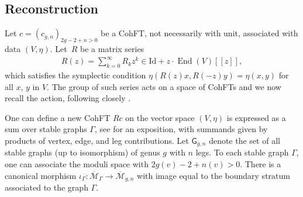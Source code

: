 \documentclass[10pt,a4paper]{amsart}
\def\oM{\overline{\mathcal{M}}}
\def\n{\mathrm{n}}
\def\V{\mathrm{V}}
\def\g{\mathrm{g}}
\def\rarr{\rightarrow}
\numberwithin{equation}{section}
\begin{document}
\subsection{Reconstruction}\label{GTC}
Let $c=(c_{g, n})_{2g-2+n>0}$ be a CohFT, not necessarily with unit,
associated with data $(V, \eta)$.
Let~$R$ be a matrix series
\begin{align*}
R(z)= \sum_{k=0}^\infty R_k z^k
\in \mathrm{Id} +z\cdot \operatorname{End}(V)[[z]],
\end{align*}
which satisfies the symplectic condition
$\eta(R(z)x,R(-z)y)=\eta(x,y)$
for all $x$, $y$ in $V$. The group of such series acts on a space of CohFTs and we now recall the action, following closely \cite[Section~1.2.1]{PPP}.

One can define a
 new CohFT $Rc$
on the vector space $(V, \eta)$ is expressed as a sum over stable graphs $\Gamma$, see \cite[Section 0.2]{PPZ} for an exposition,
with summands given by
 products of vertex, edge, and leg contributions. Let $\mathsf{G}_{g,n}$ denote the set of all stable graphs
(up to isomorphism) of genus $g$ with $n$ legs. To each stable graph $\Gamma$, one can associate the moduli space
\smash{$
\oM_\Gamma =\prod_{v\in \V} \oM_{\g(v),\n(v)}
$}
with $2g(v)-2+n(v)>0$.
 There is a
canonical morphism
$\iota_{\Gamma}\colon \oM_{\Gamma} \rarr \oM_{g,n}$
 with image equal to the boundary stratum
associated to the graph $\Gamma$.
\end{document}

